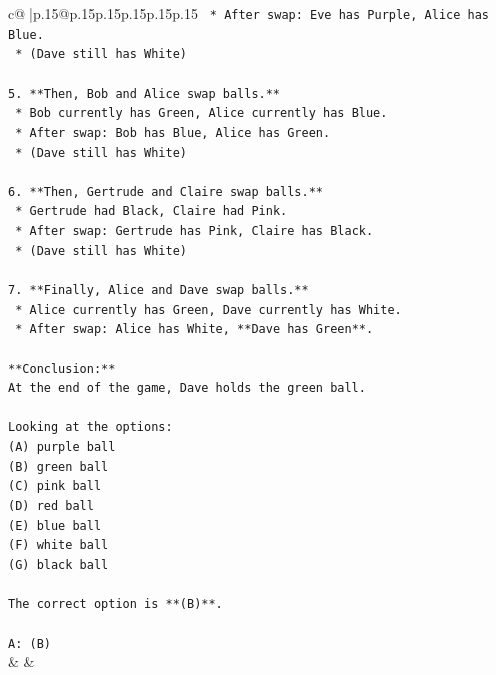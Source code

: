 \documentclass{article}
\begin{document}
{\begin{supertabular}{c@{$\;$}|p{.15\linewidth}@{}p{.15\linewidth}p{.15\linewidth}p{.15\linewidth}p{.15\linewidth}p{.15\linewidth}}
{{{\texttt{    *   After swap: Eve has Purple, Alice has Blue.} \\
\texttt{    *   (Dave still has White)} \\
\\ 
\texttt{5.  **Then, Bob and Alice swap balls.**} \\
\texttt{    *   Bob currently has Green, Alice currently has Blue.} \\
\texttt{    *   After swap: Bob has Blue, Alice has Green.} \\
\texttt{    *   (Dave still has White)} \\
\\ 
\texttt{6.  **Then, Gertrude and Claire swap balls.**} \\
\texttt{    *   Gertrude had Black, Claire had Pink.} \\
\texttt{    *   After swap: Gertrude has Pink, Claire has Black.} \\
\texttt{    *   (Dave still has White)} \\
\\ 
\texttt{7.  **Finally, Alice and Dave swap balls.**} \\
\texttt{    *   Alice currently has Green, Dave currently has White.} \\
\texttt{    *   After swap: Alice has White, **Dave has Green**.} \\
\\ 
\texttt{**Conclusion:**} \\
\texttt{At the end of the game, Dave holds the green ball.} \\
\\ 
\texttt{Looking at the options:} \\
\texttt{(A) purple ball} \\
\texttt{(B) green ball} \\
\texttt{(C) pink ball} \\
\texttt{(D) red ball} \\
\texttt{(E) blue ball} \\
\texttt{(F) white ball} \\
\texttt{(G) black ball} \\
\\ 
\texttt{The correct option is **(B)**.} \\
\\ 
\texttt{A: (B)} \\
            }
        }
    }
    & & \\ \\


\end{supertabular}}
\end{document}
